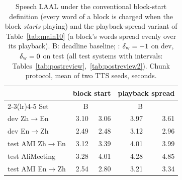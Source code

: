\begin{table}[t]
\centering\small
\setlength{\tabcolsep}{4pt}
\begin{tabular}{lrrrr}
\toprule
 & \multicolumn{2}{c}{block start} & \multicolumn{2}{c}{playback spread} \\
\cmidrule(lr){2-3}\cmidrule(lr){4-5}
Set & B & \sys{} & B & \sys{} \\
\midrule
dev Zh$\rightarrow$En & 3.10 & 3.06 & 3.97 & 3.61 \\
dev En$\rightarrow$Zh & 2.49 & 2.48 & 3.12 & 2.96 \\
test AMI Zh$\rightarrow$En & 3.12 & 3.39 & 4.01 & 3.99 \\
test AliMeeting & 3.28 & 4.01 & 4.28 & 4.85 \\
test AMI En$\rightarrow$Zh & 2.54 & 2.80 & 3.21 & 3.34 \\
\bottomrule
\end{tabular}
\caption{Speech LAAL under the conventional block-start definition (every word of a block is charged when the block \emph{starts} playing) and the playback-spread variant of Table~\ref{tab:main10} (a block's words spread evenly over its playback). B: deadline baseline; \sys{}: $\delta_{\mathrm{w}}=-1$ on dev, $\delta_{\mathrm{w}}=0$ on test (all test systems with intervals: Tables~\ref{tab:postreview},~\ref{tab:postreview2}). Chunk protocol, mean of two TTS seeds, seconds.}
\label{tab:m2laal10}
\end{table}
